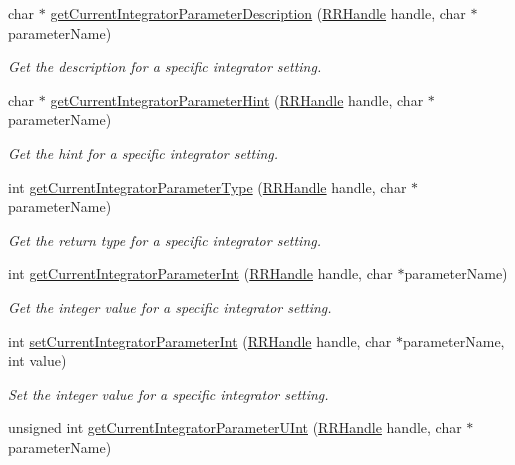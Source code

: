 \begin{DoxyCompactItemize}
char $\ast$ \hyperlink{group__simopts_gae4308a0893d84e49ef877d2db65d110c}{get\+Current\+Integrator\+Parameter\+Description} (\hyperlink{rrc__types_8h_a1d68f0592372208fa5a5f2799ea4b3ae}{R\+R\+Handle} handle, char $\ast$parameter\+Name)
\begin{DoxyCompactList}\small\item\em Get the description for a specific integrator setting. \end{DoxyCompactList}\item 
char $\ast$ \hyperlink{group__simopts_ga4cc4c3b42b58f7ce266cff67cbc79c85}{get\+Current\+Integrator\+Parameter\+Hint} (\hyperlink{rrc__types_8h_a1d68f0592372208fa5a5f2799ea4b3ae}{R\+R\+Handle} handle, char $\ast$parameter\+Name)
\begin{DoxyCompactList}\small\item\em Get the hint for a specific integrator setting. \end{DoxyCompactList}\item 
int \hyperlink{group__simopts_ga04f015cae3234d1e24dc86c4ca6cf7ab}{get\+Current\+Integrator\+Parameter\+Type} (\hyperlink{rrc__types_8h_a1d68f0592372208fa5a5f2799ea4b3ae}{R\+R\+Handle} handle, char $\ast$parameter\+Name)
\begin{DoxyCompactList}\small\item\em Get the return type for a specific integrator setting. \end{DoxyCompactList}\item 
int \hyperlink{group__simopts_ga23b63638fae7a4823ac503474126c85b}{get\+Current\+Integrator\+Parameter\+Int} (\hyperlink{rrc__types_8h_a1d68f0592372208fa5a5f2799ea4b3ae}{R\+R\+Handle} handle, char $\ast$parameter\+Name)
\begin{DoxyCompactList}\small\item\em Get the integer value for a specific integrator setting. \end{DoxyCompactList}\item 
int \hyperlink{group__simopts_ga4b5b2be1b4a77b8225f5c7d9a1e0bdfb}{set\+Current\+Integrator\+Parameter\+Int} (\hyperlink{rrc__types_8h_a1d68f0592372208fa5a5f2799ea4b3ae}{R\+R\+Handle} handle, char $\ast$parameter\+Name, int value)
\begin{DoxyCompactList}\small\item\em Set the integer value for a specific integrator setting. \end{DoxyCompactList}\item 
unsigned int \hyperlink{group__simopts_ga3f5772f9a764e74036b994c290a99a86}{get\+Current\+Integrator\+Parameter\+U\+Int} (\hyperlink{rrc__types_8h_a1d68f0592372208fa5a5f2799ea4b3ae}{R\+R\+Handle} handle, char $\ast$parameter\+Name)

\end{DoxyCompactItemize}
